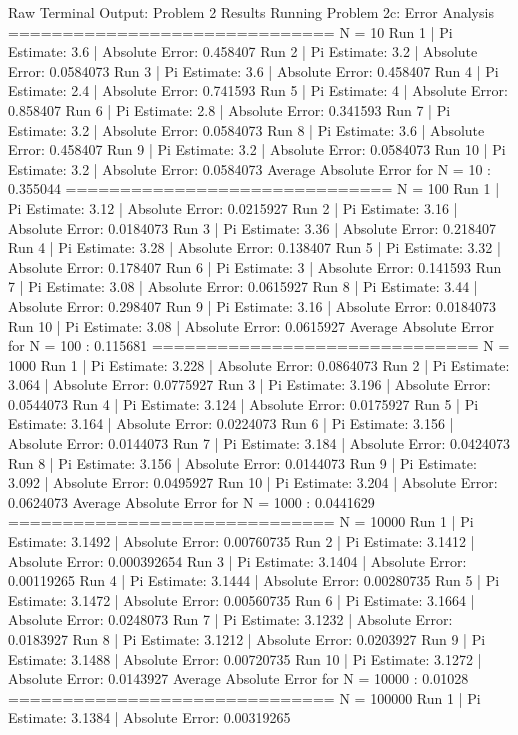 \documentclass{article}
\begin{document}
\begin{outputbox}{Raw Terminal Output: Problem 2 Results}
Running Problem 2c: Error Analysis
==============================
N = 10
Run 1 | Pi Estimate: 3.6 | Absolute Error: 0.458407
Run 2 | Pi Estimate: 3.2 | Absolute Error: 0.0584073
Run 3 | Pi Estimate: 3.6 | Absolute Error: 0.458407
Run 4 | Pi Estimate: 2.4 | Absolute Error: 0.741593
Run 5 | Pi Estimate: 4 | Absolute Error: 0.858407
Run 6 | Pi Estimate: 2.8 | Absolute Error: 0.341593
Run 7 | Pi Estimate: 3.2 | Absolute Error: 0.0584073
Run 8 | Pi Estimate: 3.6 | Absolute Error: 0.458407
Run 9 | Pi Estimate: 3.2 | Absolute Error: 0.0584073
Run 10 | Pi Estimate: 3.2 | Absolute Error: 0.0584073
Average Absolute Error for N = 10 : 0.355044
==============================
N = 100
Run 1 | Pi Estimate: 3.12 | Absolute Error: 0.0215927
Run 2 | Pi Estimate: 3.16 | Absolute Error: 0.0184073
Run 3 | Pi Estimate: 3.36 | Absolute Error: 0.218407
Run 4 | Pi Estimate: 3.28 | Absolute Error: 0.138407
Run 5 | Pi Estimate: 3.32 | Absolute Error: 0.178407
Run 6 | Pi Estimate: 3 | Absolute Error: 0.141593
Run 7 | Pi Estimate: 3.08 | Absolute Error: 0.0615927
Run 8 | Pi Estimate: 3.44 | Absolute Error: 0.298407
Run 9 | Pi Estimate: 3.16 | Absolute Error: 0.0184073
Run 10 | Pi Estimate: 3.08 | Absolute Error: 0.0615927
Average Absolute Error for N = 100 : 0.115681
==============================
N = 1000
Run 1 | Pi Estimate: 3.228 | Absolute Error: 0.0864073
Run 2 | Pi Estimate: 3.064 | Absolute Error: 0.0775927
Run 3 | Pi Estimate: 3.196 | Absolute Error: 0.0544073
Run 4 | Pi Estimate: 3.124 | Absolute Error: 0.0175927
Run 5 | Pi Estimate: 3.164 | Absolute Error: 0.0224073
Run 6 | Pi Estimate: 3.156 | Absolute Error: 0.0144073
Run 7 | Pi Estimate: 3.184 | Absolute Error: 0.0424073
Run 8 | Pi Estimate: 3.156 | Absolute Error: 0.0144073
Run 9 | Pi Estimate: 3.092 | Absolute Error: 0.0495927
Run 10 | Pi Estimate: 3.204 | Absolute Error: 0.0624073
Average Absolute Error for N = 1000 : 0.0441629
==============================
N = 10000
Run 1 | Pi Estimate: 3.1492 | Absolute Error: 0.00760735
Run 2 | Pi Estimate: 3.1412 | Absolute Error: 0.000392654
Run 3 | Pi Estimate: 3.1404 | Absolute Error: 0.00119265
Run 4 | Pi Estimate: 3.1444 | Absolute Error: 0.00280735
Run 5 | Pi Estimate: 3.1472 | Absolute Error: 0.00560735
Run 6 | Pi Estimate: 3.1664 | Absolute Error: 0.0248073
Run 7 | Pi Estimate: 3.1232 | Absolute Error: 0.0183927
Run 8 | Pi Estimate: 3.1212 | Absolute Error: 0.0203927
Run 9 | Pi Estimate: 3.1488 | Absolute Error: 0.00720735
Run 10 | Pi Estimate: 3.1272 | Absolute Error: 0.0143927
Average Absolute Error for N = 10000 : 0.01028
==============================
N = 100000
Run 1 | Pi Estimate: 3.1384 | Absolute Error: 0.00319265

\end{outputbox}
\end{document}
